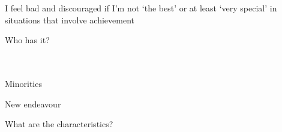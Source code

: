 \documentclass[aspectratio=169]{beamer}
\begin{document}
\begin{frame}
  \begin{center}
    \Huge  I  feel  bad  and  discouraged  if  I’m  not  `the  best'  or  at  least  `very  special'  in  situations  that  involve  achievement
  \end{center}
\end{frame}

\begin{frame}
  \begin{center}
    \Huge Who has it?
    \\ \small \cite{clanceimes78}
    \\ \small \cite{attr98}
    \\ \small \cite{colour}
  \end{center}
\end{frame}

\begin{frame}
  \begin{center}
    \Huge Minorities
    \\ \small \cite{apa13}
  \end{center}
\end{frame}

\begin{frame}
  \begin{center}
    \Huge New endeavour
    \\ \small \cite{apa13}
  \end{center}
\end{frame}

\begin{frame}
  \begin{center}
    \Huge What are the characteristics?
  \end{center}
\end{frame}
\end{document}
